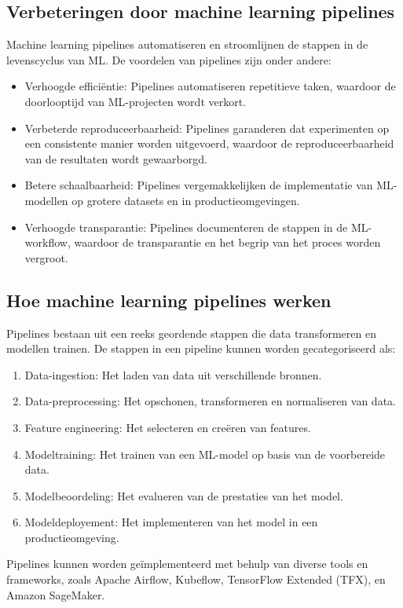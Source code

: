 \subsection{Verbeteringen door machine learning pipelines}

Machine learning pipelines automatiseren en stroomlijnen de stappen in de levenscyclus van ML. De voordelen van pipelines zijn onder andere:
\begin{itemize}
    \item Verhoogde efficiëntie: Pipelines automatiseren repetitieve taken, waardoor de doorlooptijd van ML-projecten wordt verkort.
    \item Verbeterde reproduceerbaarheid: Pipelines garanderen dat experimenten op een consistente manier worden uitgevoerd, waardoor de reproduceerbaarheid van de resultaten wordt gewaarborgd.
    \item Betere schaalbaarheid: Pipelines vergemakkelijken de implementatie van ML-modellen op grotere datasets en in productieomgevingen.
    \item Verhoogde transparantie: Pipelines documenteren de stappen in de ML-workflow, waardoor de transparantie en het begrip van het proces worden vergroot.
\end{itemize}

\subsection{Hoe machine learning pipelines werken}

Pipelines bestaan uit een reeks geordende stappen die data transformeren en modellen trainen. De stappen in een pipeline kunnen worden gecategoriseerd als:
\begin{enumerate}[label=\arabic*.]
    \item Data-ingestion: Het laden van data uit verschillende bronnen.
    \item Data-preprocessing: Het opschonen, transformeren en normaliseren van data.
    \item Feature engineering: Het selecteren en creëren van features.
    \item Modeltraining: Het trainen van een ML-model op basis van de voorbereide data.
    \item Modelbeoordeling: Het evalueren van de prestaties van het model.
    \item Modeldeployement: Het implementeren van het model in een productieomgeving.
\end{enumerate}
Pipelines kunnen worden geïmplementeerd met behulp van diverse tools en frameworks, zoals Apache Airflow, Kubeflow, TensorFlow Extended (TFX), en Amazon SageMaker.

